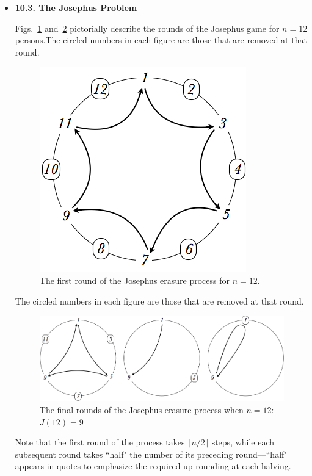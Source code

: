 \begin{itemize}
\item
{\bf 10.3. The Josephus Problem}
\medskip

Figs.~\ref{fig:josephus12step1} and~\ref{fig:josephus12step2} pictorially describe the rounds of the Josephus game for $n=12$ persons.The circled numbers in each figure are those that are removed at that round.
\begin{figure}[ht]
\begin{center}
        \includegraphics[scale=0.3]{FiguresMaths/josephus12step1}
\caption{The first round of the Josephus erasure process for $n=12$.}
        \label{fig:josephus12step1} 
\end{center}
\end{figure}
The circled numbers in each figure are those that are removed at that round.
\begin{figure}[ht]
\begin{center}
        \includegraphics[scale=0.3]{FiguresMaths/josephus12LastSteps}
        \caption{The final rounds of the Josephus erasure process when $n=12$: \ $J(12) = 9$}
        \label{fig:josephus12step2}
\end{center}
\end{figure}
Note that the first round of the process takes $\lceil n/2 \rceil$ steps, while each subsequent round takes ``half" the number of its preceding round---``half" appears in quotes to emphasize the required up-rounding at each halving.


\end{itemize}
